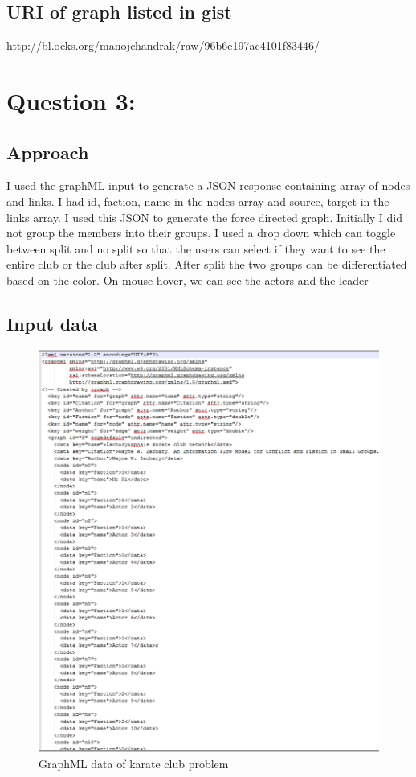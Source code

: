 \documentclass[12pt]{article}
\begin{document}
\subsection{URI of graph listed in gist}
\url{http://bl.ocks.org/manojchandrak/raw/96b6e197ac4101f83446/}
\newpage

\section{Question 3: }
\subsection{Approach}
I used the graphML input to generate a JSON response containing array of nodes and links. I had id, faction, name in the nodes array and source, target in the links array. I used this JSON to generate the force directed graph. Initially I did not group the members into their groups. I used a drop down which can toggle between split and no split so that the users can select if they want to see the entire club or the club after split. After split the two groups can be differentiated based on the color. On mouse hover, we can see the actors and the leader  
\subsection{Input data}
\begin{figure}[ht]
\includegraphics[scale=0.4]{../q3/graphml.png}
\centering
\caption{GraphML data of karate club problem}
\label{}
\end{figure}
\newpage
\end{document}
